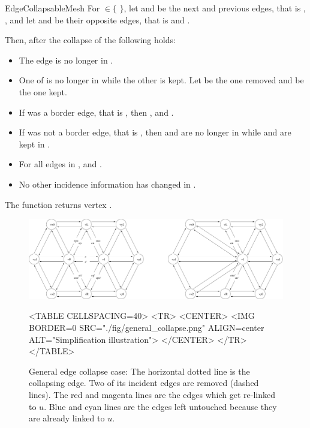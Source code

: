 \begin{ccRefConcept}{EdgeCollapsableMesh}
For  $\in \{$  $\}$, let  and  be the next and previous 
edges, that is , , and let 
 and  be their opposite edges, that is 
 and .

Then, after the collapse of  the following holds:

\begin{itemize}
\item The edge  is no longer in .
\item One of  is no longer in  while the other is kept. Let  be the one removed and  be the one kept.
\item If  was a border edge, that is , then , and .
\item If  was not a border edge, that is , then  and  are no longer in  while  and  are kept in .
\item For all edges  in ,  and .
\item No other incidence information has changed in .
\end{itemize}

The function returns vertex . 

\begin{figure}[htbp]
\begin{ccTexOnly}
\begin{center}
\includegraphics[width=17cm]{Surface_mesh_simplification_ref/fig/general_collapse} %
\end{center}
\end{ccTexOnly}
\begin{ccHtmlOnly}
<TABLE CELLSPACING=40>
<TR>
<CENTER>
<IMG BORDER=0 SRC="./fig/general_collapse.png" ALIGN=center ALT="Simplification illustration">
</CENTER>
</TR>
</TABLE>
\end{ccHtmlOnly}
\caption{General edge collapse case: The horizontal dotted line is the collapsing edge. Two of its incident edges are removed (dashed lines). The red and magenta lines are the edges which get re-linked to $u$. Blue and cyan lines are the edges left untouched because they are already linked to $u$.}
\end{figure}



\end{ccRefConcept}
